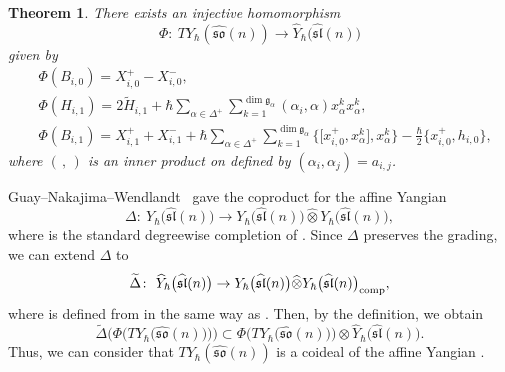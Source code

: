 \documentclass[pdftex]{sigma}
\numberwithin{equation}{section}
\newtheorem{Theorem}{Theorem}[section]
\theoremstyle{definition}
\begin{document}
\begin{Theorem}\label{coi}
There exists an injective homomorphism
\begin{equation*}
\Phi\colon\ TY_{\hbar}(\widehat{\mathfrak{so}}(n))\to \widehat{Y}_{\hbar}\bigl(\widehat{\mathfrak{sl}}(n)\bigr)
\end{equation*}
given by
\begin{align*}
&\Phi(B_{i,0})=X^+_{i,0}-X^-_{i,0},\\
&\Phi(H_{i,1})=2\widetilde{H}_{i,1}+\hbar\sum_{\alpha\in\Delta^+}\limits\sum_{k=1}^{\dim \mathfrak{g}_\alpha}(\alpha_i,\alpha)x_\alpha^k x_\alpha^k,\\
&\Phi(B_{i,1})=X^+_{i,1}+X^-_{i,1}+\hbar\sum_{\alpha\in\Delta^+}\limits\sum_{k=1}^{\dim \mathfrak{g}_\alpha}\bigl\{\bigl[x^+_{i,0},x_\alpha^k\bigr],x_\alpha^k\bigr\}-\frac{\hbar}{2}\bigl\{x^+_{i,0},h_{i,0}\bigr\},
\end{align*}
where $(\, ,\, )$ is an inner product on  defined by $(\alpha_i,\alpha_j)=a_{i,j}$.
\end{Theorem}
Guay--Nakajima--Wendlandt~\cite{GNW} gave the coproduct for the affine Yangian
\begin{equation*}
\Delta\colon\ Y_\hbar\bigl(\widehat{\mathfrak{sl}}(n)\bigr)\to Y_\hbar\bigl(\widehat{\mathfrak{sl}}(n)\bigr)\widehat{\otimes}Y_\hbar\bigl(\widehat{\mathfrak{sl}}(n)\bigr),
\end{equation*}
where  is the standard degreewise completion of . Since $\Delta$ preserves the grading, we can extend $\Delta$ to
\begin{equation*}
\widetilde{\Delta}\colon\ \widehat{Y}_{\hbar}\bigl(\widehat{\mathfrak{sl}}(n)\bigr)\to Y_\hbar\bigl(\widehat{\mathfrak{sl}}(n)\bigr)\widehat{\otimes}Y_\hbar\bigl(\widehat{\mathfrak{sl}}(n)\bigr)_{\rm comp},
\end{equation*}
where  is defined from  in the same way as . Then, by the definition, we obtain
\begin{equation*}
\widetilde{\Delta}\bigl(\Phi\bigl(TY_{\hbar}\bigl(\widehat{\mathfrak{so}}(n)\bigr)\bigr)\bigr)\subset \Phi\bigl(TY_{\hbar}\bigl(\widehat{\mathfrak{so}}(n)\bigr)\bigr)\otimes\widehat{Y}_{\hbar}\bigl(\widehat{\mathfrak{sl}}(n)\bigr).
\end{equation*}
Thus, we can consider that $TY_{\hbar}(\widehat{\mathfrak{so}}(n))$ is a coideal of the affine Yangian .
\end{document}
